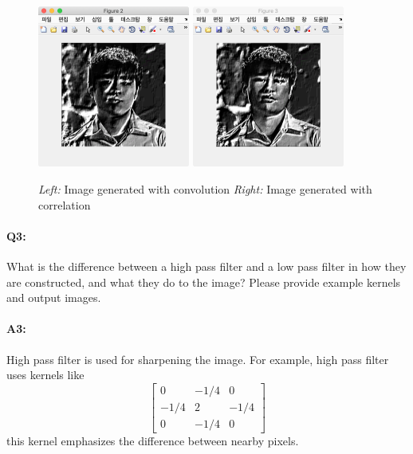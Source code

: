 	\begin{figure}[h]
		\centering
		\includegraphics[width=5cm]{maru_conv.png}
		\includegraphics[width=5cm]{maru_corr.png}
		\caption{\emph{Left:} Image generated with convolution \emph{Right:} Image generated with correlation}
		\label{fig:convolution and correlation}
	\end{figure}
	
	\pagebreak
	\paragraph{Q3:} What is the difference between a high pass filter and a low pass filter in how they are constructed, and what they do to the image? Please provide example kernels and output images.
	
	\paragraph{A3:} High pass filter is used for sharpening the image. For example, high pass filter uses kernels like
	\begin{equation*}
		\begin{bmatrix}
			0 & -1/4 & 0 \\
			-1/4 & 2 & -1/4 \\
			0 & -1/4 & 0
		\end{bmatrix}
	\end{equation*}
	this kernel emphasizes the difference between nearby pixels.
	
